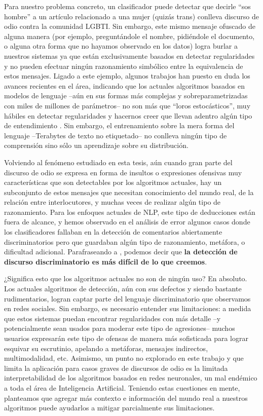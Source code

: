 Para nuestro problema concreto, un clasificador puede detectar que decirle ``sos hombre'' a un artículo relacionado a una mujer (quizás trans) conlleva discurso de odio contra la comunidad LGBTI. Sin embargo, este mismo mensaje ofuscado de alguna manera (por ejemplo, preguntándole el nombre, pidiéndole el documento, o alguna otra forma que no hayamos observado en los datos) logra burlar a nuestros sistemas ya que están exclusivamente basados en detectar regularidades y no pueden efectuar ningún razonamiento simbólico entre la equivalencia de estos mensajes. Ligado a este ejemplo, algunos trabajos han puesto en duda los avances recientes en el área, indicando que los actuales algoritmos basados en modelos de lenguaje --aún en sus formas más complejas y sobreparametrizadas con miles de millones de parámetros-- no son más que ``loros estocásticos'', muy hábiles en detectar regularidades y hacernos creer que llevan adentro algún tipo de entendimiento \cite{bender-koller-2020-climbing,bender2021dangers}. Sin embargo, el entrenamiento sobre la mera forma del lenguaje --Terabytes de texto no etiquetado-- no conlleva ningún tipo de comprensión sino sólo un aprendizaje sobre su distribución.

Volviendo al fenómeno estudiado en esta tesis, aún cuando gran parte del discurso de odio se expresa en forma de insultos o expresiones ofensivas muy características que son detectables por los algoritmos actuales, hay un subconjunto de estos mensajes que necesitan conocimiento del mundo real, de la relación entre interlocutores, y muchas veces de realizar algún tipo de razonamiento. Para los enfoques actuales de NLP, este tipo de deducciones están fuera de alcance, y hemos observado en el análisis de error algunos casos donde los clasificadores fallaban en la detección de comentarios abiertamente discriminatorios pero que guardaban algún tipo de razonamiento, metáfora, o dificultad adicional. Parafraseando a \citet{mitchell2021ai}, podemos decir que \textbf{la detección de discurso discriminatorio es más difícil de lo que creemos}.

¿Significa esto que los algoritmos actuales no son de ningún uso? En absoluto. Los actuales algoritmos de detección, aún con sus defectos y siendo bastante rudimentarios, logran captar parte del lenguaje discriminatorio que observamos en redes sociales. Sin embargo, es necesario entender sus limitaciones: a medida que estos sistemas puedan encontrar regularidades con más detalle --y potencialmente sean usados para moderar este tipo de agresiones-- muchos usuarios expresarán este tipo de ofensas de manera más sofisticada para lograr esquivar su escrutinio, apelando a metáforas, mensajes indirectos, multimodalidad, etc. Asimismo, un punto no explorado en este trabajo y que limita la aplicación para casos graves de discursos de odio es la limitada interpretabilidad de los algoritmos basados en redes neuronales, un mal endémico a toda el área de Inteligencia Artificial. Teniendo estas cuestiones en mente, planteamos que agregar más contexto e información del mundo real a nuestros algoritmos puede ayudarlos a mitigar parcialmente sus limitaciones.

